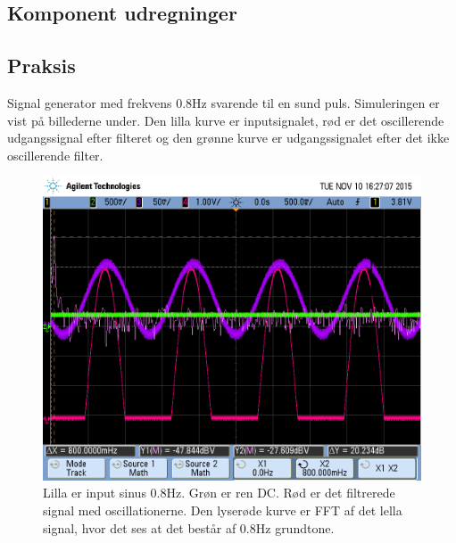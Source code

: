 \subsection{Komponent udregninger}


\subsection{Praksis}
Signal generator med frekvens 0.8Hz svarende til en sund puls. Simuleringen er vist på billederne under. Den lilla kurve er inputsignalet, rød er det oscillerende udgangssignal efter filteret og den grønne kurve er udgangssignalet efter det ikke oscillerende filter.

\begin{figure}[H]
	\includegraphics[width=\textwidth]{billeder/scope_9.png}
	\caption{Lilla er input sinus 0.8Hz. Grøn er ren DC. Rød er det filtrerede signal med oscillationerne. Den lyserøde kurve er FFT af det lella signal, hvor det ses at det består af 0.8Hz grundtone.}\label{fig:filterone}
\end{figure}

